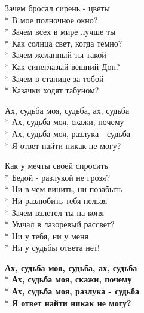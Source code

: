 \medskip

\begin{minipage}{\linewidth}
Зачем бросал сирень - цветы\\*
В мое полночное окно?\\*
Зачем всех в мире лучше ты\\*
Как солнца свет, когда темно?\\*
Зачем желанный ты такой\\*
Как синеглазый вешний Дон?\\*
Зачем в станице за тобой\\*
Казачки ходят табуном?\\
\end{minipage}\par\medskip\nobreak

\medskip

\begin{minipage}{\linewidth}
\hspace*{1.5em}Ах, судьба моя, судьба, ах, судьба\\*
\hspace*{1.5em}Ах, судьба моя, скажи, почему\\*
\hspace*{1.5em}Ах, судьба моя, разлука - судьба\\*
\hspace*{1.5em}Я ответ найти никак не могу?\\
\end{minipage}\par\medskip\nobreak

\medskip

\begin{minipage}{\linewidth}
Как у мечты своей спросить\\*
Бедой - разлукой не грозя?\\*
Ни в чем винить, ни позабыть\\*
Ни разлюбить тебя нельзя\\*
Зачем взлетел ты на коня\\*
Умчал в лазоревый рассвет?\\*
Ни у тебя, ни у меня\\*
Ни у судьбы ответа нет!\\
\end{minipage}\par\medskip\nobreak

\medskip

\begin{minipage}{\linewidth}
\hspace*{1.5em}\textbf{Ах, судьба моя, судьба, ах, судьба}\\*
\hspace*{1.5em}\textbf{Ах, судьба моя, скажи, почему}\\*
\hspace*{1.5em}\textbf{Ах, судьба моя, разлука - судьба}\\*
\hspace*{1.5em}\textbf{Я ответ найти никак не могу?}\\
\end{minipage}

